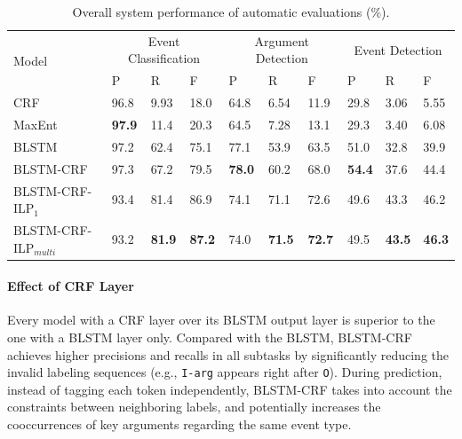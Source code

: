 \begin{table}[!t]
\centering
\small
\begin{tabular}{|l|p{0.8cm}<{\centering}|p{0.8cm}<{\centering}|p{0.8cm}<{\centering}|p{0.8cm}<{\centering}|p{0.8cm}<{\centering}|p{0.8cm}<{\centering}|p{0.8cm}<{\centering}|p{0.8cm}<{\centering}|p{0.8cm}<{\centering}|} \hline
	\multirow{2}{*}{Model} & \multicolumn{3}{c|}{Event Classification} & \multicolumn{3}{c|}{Argument Detection} &
	\multicolumn{3}{c|}{Event Detection} \\ \cline{2-10}
	 & P & R & F & P & R & F & P & R & F \\ \hline
	CRF & 96.8 & 9.93 & 18.0 & 64.8 & 6.54 & 11.9 & 29.8 & 3.06 & 5.55 \\ \hline
	MaxEnt & \textbf{97.9} & 11.4 & 20.3 & 64.5 & 7.28 & 13.1 & 29.3 & 3.40 & 6.08 \\ \hline
	BLSTM & 97.2 & 62.4 & 75.1 & 77.1 & 53.9 & 63.5 & 51.0 & 32.8 & 39.9  \\ \hline \hline
	BLSTM-CRF & 97.3 & 67.2 & 79.5 & \textbf{78.0} & 60.2 & 68.0  & \textbf{54.4} & 37.6 & 44.4  \\ \hline
	BLSTM-CRF-ILP$_{1}$ & 93.4 & 81.4 & 86.9 & 74.1 & 71.1 & 72.6  & 49.6 & 43.3 & 46.2 \\ \hline
	BLSTM-CRF-ILP$_{multi}$ & 93.2 & \textbf{81.9} & \textbf{87.2} &  74.0 & \textbf{71.5} & \textbf{72.7} & 49.5 & \textbf{43.5} & \textbf{46.3} \\ \hline
\end{tabular}
\caption{Overall system performance of automatic evaluations (\%).  \label{tab:1}}
\vspace{-0.5em}
\end{table}


\paragraph{Effect of CRF Layer} 
Every model with a CRF layer over its BLSTM output layer is superior to the one with a BLSTM layer only. Compared with the BLSTM, BLSTM-CRF achieves higher precisions and recalls in all subtasks by significantly reducing the invalid labeling sequences (e.g., \texttt{I-arg} appears right after \texttt{O}). During prediction, instead of tagging each token independently, BLSTM-CRF takes into account the constraints between neighboring labels, and potentially increases the cooccurrences of key arguments regarding the same event type. %

